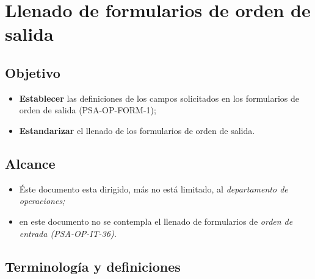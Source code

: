 \renewcommand{\Codigo}{BPD-PROG}
\renewcommand{\FechaPub}{2023-01}
\renewcommand{\Edit}{03}
\renewcommand{\Titulo}{Llenado de formularios de orden de salida}
\section{\Titulo}


\subsection{Objetivo}

\begin{itemize}
	\item \textbf{Establecer} las definiciones de los campos solicitados en los formularios de orden de salida (PSA-OP-FORM-1);
	\item \textbf{Estandarizar} el llenado de los formularios de orden de salida.
\end{itemize}

\subsection{Alcance}

\begin{itemize}
	\item Éste documento esta dirigido, más no está limitado, al \emph{departamento de operaciones;}
	\item en este documento no se contempla el llenado de formularios de \emph{orden de entrada (PSA-OP-IT-36).}
\end{itemize}

\subsection{Terminología y definiciones}

